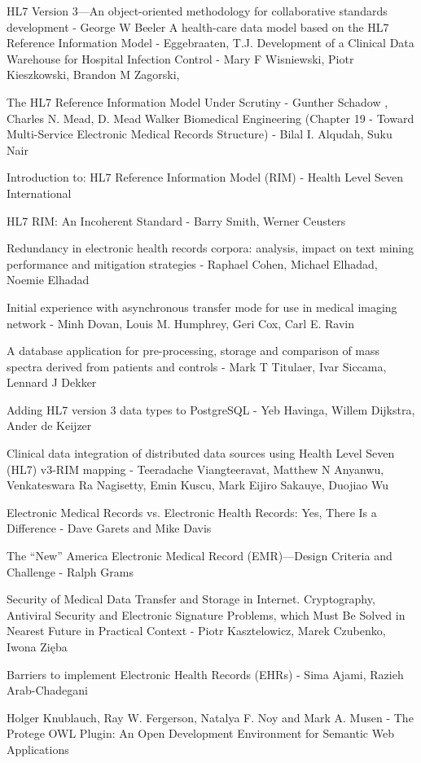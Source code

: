 \begin{thebibliography}{1}
HL7 Version 3—An object-oriented methodology for collaborative standards development - George W Beeler
A health-care data model based on the HL7 Reference Information Model - Eggebraaten, T.J.
Development of a Clinical Data Warehouse for Hospital Infection Control - Mary F Wisniewski, Piotr Kieszkowski, Brandon M Zagorski, 

The HL7 Reference Information Model Under Scrutiny - Gunther Schadow , Charles N. Mead, D. Mead Walker
Biomedical Engineering (Chapter 19 - Toward Multi-Service Electronic Medical Records Structure) - Bilal I. Alqudah, Suku Nair

Introduction to: HL7 Reference Information Model (RIM) - Health Level Seven International

HL7 RIM: An Incoherent Standard - Barry Smith, Werner Ceusters

Redundancy in electronic health records corpora: analysis, impact on text mining performance and mitigation strategies - Raphael Cohen, Michael Elhadad, Noemie Elhadad

Initial experience with asynchronous transfer mode for use in medical imaging network - Minh Dovan, Louis M. Humphrey, Geri Cox, Carl E. Ravin

A database application for pre-processing, storage and comparison of mass spectra derived  from patients and controls - Mark T Titulaer, Ivar Siccama, Lennard J Dekker

Adding HL7 version 3 data types to PostgreSQL - Yeb Havinga, Willem Dijkstra, Ander de Keijzer

Clinical data integration of distributed data sources using Health Level Seven (HL7) v3-RIM mapping - Teeradache Viangteeravat, Matthew N Anyanwu, Venkateswara Ra Nagisetty, Emin Kuscu, Mark Eijiro Sakauye, Duojiao Wu

Electronic Medical Records vs. Electronic Health Records: Yes, There Is a Difference - Dave Garets and Mike Davis

The “New” America Electronic Medical Record (EMR)—Design Criteria and Challenge - Ralph Grams

Security of Medical Data Transfer and Storage in Internet. Cryptography, Antiviral Security and Electronic Signature Problems, which Must Be Solved in Nearest Future in Practical Context - Piotr Kasztelowicz, Marek Czubenko, Iwona Zięba

Barriers to implement Electronic Health Records (EHRs) - Sima Ajami, Razieh Arab-Chadegani

Holger Knublauch, Ray W. Fergerson, Natalya F. Noy and Mark A. Musen - The Protege OWL Plugin: An Open Development Environment for Semantic Web Applications

\end{thebibliography}